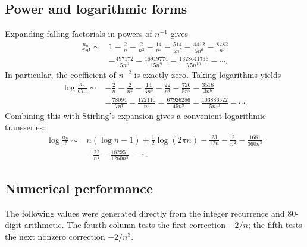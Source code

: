 \documentclass[11pt,a4paper]{article}
\theoremstyle{definition}
\theoremstyle{remark}
\newcommand{\constC}{\mathcal{C}}
\begin{document}
\subsection{Power and logarithmic forms}

Expanding falling factorials in powers of \(n^{-1}\) gives
\begin{equation}\label{eq:ratioexpansion}
\begin{split}
 \frac{a_n}{\constC n!}\sim{}&1-\frac{2}{n}-\frac{2}{n^3}-\frac{14}{n^4}
 -\frac{514}{5n^5}-\frac{4412}{5n^6}-\frac{8782}{n^7}\\
 &-\frac{497172}{5n^8}-\frac{18919774}{15n^9}
 -\frac{1328641736}{75n^{10}}-\cdots.
\end{split}
\end{equation}
In particular, the coefficient of \(n^{-2}\) is exactly zero.  Taking logarithms yields
\begin{equation}\label{eq:logratio}
\begin{split}
 \log\frac{a_n}{\constC n!}\sim{}&-\frac2n-\frac2{n^2}-\frac{14}{3n^3}
 -\frac{22}{n^4}-\frac{726}{5n^5}-\frac{3518}{3n^6}\\
 &-\frac{78094}{7n^7}-\frac{122110}{n^8}
 -\frac{67926286}{45n^9}-\frac{103886522}{5n^{10}}-\cdots.
\end{split}
\end{equation}
Combining this with Stirling's expansion gives a convenient logarithmic transseries:
\begin{equation}\label{eq:loga}
\begin{split}
 \log\frac{a_n}{\constC}
 \sim{}&n(\log n-1)+\frac12\log(2\pi n)
 -\frac{23}{12n}-\frac2{n^2}-\frac{1681}{360n^3}\\
 &-\frac{22}{n^4}-\frac{182951}{1260n^5}-\cdots.
\end{split}
\end{equation}

\subsection{Numerical performance}

The following values were generated directly from the integer recurrence and 80-digit arithmetic.  The fourth column tests the first correction \(-2/n\); the fifth tests the next nonzero correction \(-2/n^3\).
\end{document}
